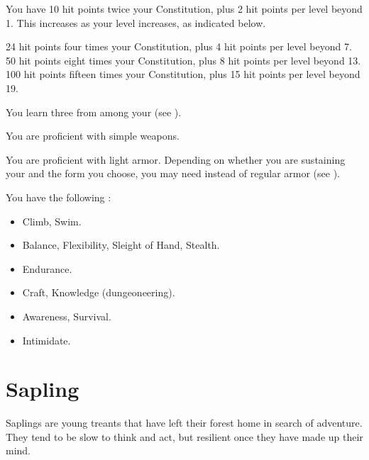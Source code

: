       You have 10 hit points \add twice your Constitution, plus 2 hit points per level beyond 1.
      This increases as your level increases, as indicated below.
      \begin{itemize}
         24 hit points \add four times your Constitution, plus 4 hit points per level beyond 7.
         50 hit points \add eight times your Constitution, plus 8 hit points per level beyond 13.
         100 hit points \add fifteen times your Constitution, plus 15 hit points per level beyond 19.
      \end{itemize}

      You learn three  from among your  (see ).

      You are proficient with simple weapons.

      You are proficient with light armor.
      Depending on whether you are sustaining your  and the form you choose, you may need  instead of regular armor (see ).

      You have the following :
      \begin{itemize}
        \item {} Climb, Swim.
        \item {} Balance, Flexibility, Sleight of Hand, Stealth.
        \item {} Endurance.
        \item {} Craft, Knowledge (dungeoneering).
        \item {} Awareness, Survival.
        \item {} Intimidate.
      \end{itemize}

\section{Sapling}

  Saplings are young treants that have left their forest home in search of adventure.
  They tend to be slow to think and act, but resilient once they have made up their mind.

